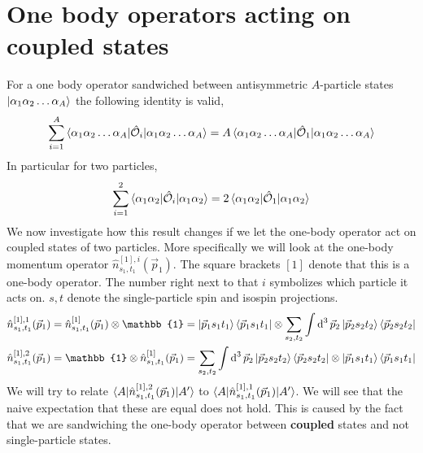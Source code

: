 \documentclass[10pt]{article}
\begin{document}
\section{One body operators acting on coupled states}
For a one body operator sandwiched between antisymmetric $A$-particle states $\ket{ \alpha_1 \alpha_2 \ldots \alpha_A}$ the following identity is valid,
\begin{align*}
	\sum_{i=1}^{A} \braket{ \alpha_1 \alpha_2 \ldots \alpha_A | \hat{\mathcal{O}}_{i} | \alpha_1 \alpha_2 \ldots \alpha_A} = A \braket{ \alpha_1 \alpha_2 \ldots \alpha_A | \hat{\mathcal{O}}_{1} | \alpha_1 \alpha_2 \ldots \alpha_A}
\end{align*}
In particular for two particles,
\begin{align*}
	\sum_{i=1}^{2} \braket{ \alpha_1 \alpha_2 | \hat{\mathcal{O}}_{i} | \alpha_1 \alpha_2} = 2 \braket{ \alpha_1 \alpha_2 | \hat{\mathcal{O}}_{1} | \alpha_1 \alpha_2}
\end{align*}
We now investigate how this result changes if we let the one-body operator act on coupled states of two particles. More specifically we will look at the one-body momentum operator $\hat{n}^{[1],i}_{s_1,t_1}(\vec{p}_1)$. The square brackets $[1]$ denote that this is a one-body operator. The number right next to that $i$ symbolizes which particle it acts on. $s,t$ denote the single-particle spin and isospin projections.
\begin{align*}
	\hat{n}^{[1],1}_{s_1,t_1}(\vec{p}_1) &= \hat{n}^{[1]}_{s_1,t_1}(\vec{p}_1) \otimes \mathbb{1} = \ket{\vec{p}_1 s_1 t_1} \bra{ \vec{p}_1 s_1 t_1} \otimes \sum_{s_2,t_2} \int \text{d}^{3} \, \vec{p}_{2} \ket{ \vec{p}_2 s_2 t_2} \bra{ \vec{p}_2 s_2 t_2} \\
	\hat{n}^{[1],2}_{s_1,t_1}(\vec{p}_1) &= \mathbb{1} \otimes \hat{n}^{[1]}_{s_1,t_1}(\vec{p}_1) = \sum_{s_2,t_2} \int \text{d}^{3} \, \vec{p}_{2} \ket{ \vec{p}_2 s_2 t_2} \bra{ \vec{p}_2 s_2 t_2} \otimes \ket{ \vec{p}_1 s_1 t_1} \bra{ \vec{p}_1 s_1 t_1} 
\end{align*}
We will try to relate $ \braket{ A | \hat{n}^{[1],2}_{s_1,t_1}(\vec{p}_1) | A'}$ to $ \braket{ A | \hat{n}^{[1],1}_{s_1,t_1}(\vec{p}_1) | A'}$. We will see that the naive expectation that these are equal does not hold. This is caused by the fact that we are sandwiching the one-body operator between \textbf{coupled} states and not single-particle states.
\end{document}
